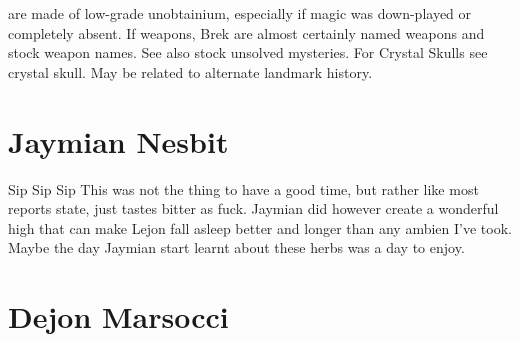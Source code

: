 \documentclass[12pt]{book}
\begin{document}
are made of low-grade unobtainium, especially if magic was down-played or completely absent. If weapons, Brek are almost certainly named weapons and stock weapon names. See also stock unsolved mysteries. For Crystal Skulls see crystal skull. May be related to alternate landmark history.



\chapter{Jaymian Nesbit}

Sip Sip Sip This was not the thing to have a good time, but rather like most reports state, just tastes bitter as fuck. Jaymian did however create a wonderful high that can make Lejon fall asleep better and longer than any ambien I've took. Maybe the day Jaymian start learnt about these herbs was a day to enjoy.






\chapter{Dejon Marsocci}
\end{document}
